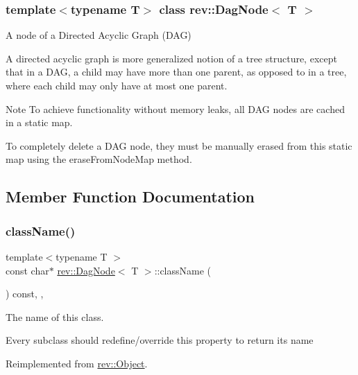 \subsubsection*{template$<$typename T$>$\newline
class rev\+::\+Dag\+Node$<$ T $>$}

A node of a Directed Acyclic Graph (D\+AG) 

A directed acyclic graph is more generalized notion of a tree structure, except that in a D\+AG, a child may have more than one parent, as opposed to in a tree, where each child may only have at most one parent.

\begin{DoxyNote}{Note}
To achieve functionality without memory leaks, all D\+AG nodes are cached in a static map.
\end{DoxyNote}
To completely delete a D\+AG node, they must be manually erased from this static map using the erase\+From\+Node\+Map method. 

\subsection{Member Function Documentation}
\mbox{\label{classrev_1_1_dag_node_ab769f5f1cc1bdb1dde07c8d1466fad56}} 
\subsubsection{\texorpdfstring{className()}{className()}}
{\footnotesize\ttfamily template$<$typename T $>$ \\
const char$\ast$ \mbox{\hyperlink{classrev_1_1_dag_node}{rev\+::\+Dag\+Node}}$<$ T $>$\+::class\+Name (\begin{DoxyParamCaption}{ }\end{DoxyParamCaption}) const\hspace{0.3cm}{\ttfamily [inline]}, {\ttfamily [override]}, {\ttfamily [virtual]}}



The name of this class. 

Every subclass should redefine/override this property to return its name 

Reimplemented from \mbox{\hyperlink{classrev_1_1_object_a7a2013f91169479b65cf93afdc5d9a68}{rev\+::\+Object}}.



